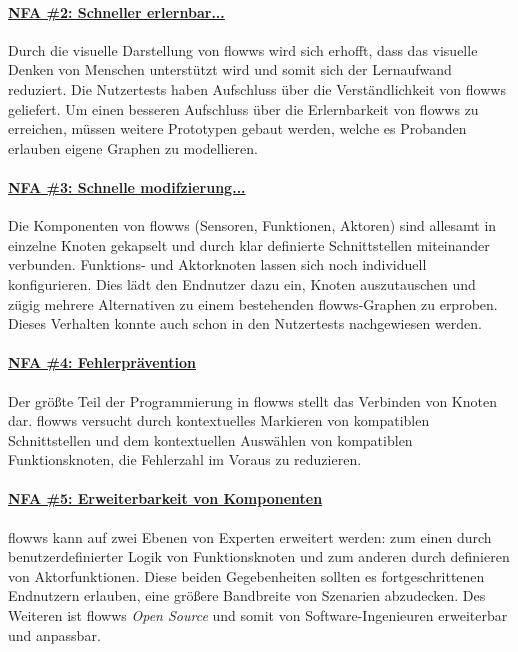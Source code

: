 \paragraph{\hyperref[tab:NFA2]{NFA \#2: Schneller erlernbar...}} Durch die visuelle Darstellung von flowws wird sich erhofft, dass das visuelle Denken von Menschen unterstützt wird und somit sich der Lernaufwand reduziert. Die Nutzertests haben Aufschluss über die Verständlichkeit von flowws geliefert. Um einen besseren Aufschluss über die Erlernbarkeit von flowws zu erreichen, müssen weitere Prototypen gebaut werden, welche es Probanden erlauben eigene Graphen zu modellieren.

\paragraph{\hyperref[tab:NFA3]{NFA \#3: Schnelle modifzierung...}} Die Komponenten von flowws (Sensoren, Funktionen, Aktoren) sind allesamt in einzelne Knoten gekapselt und durch klar definierte Schnittstellen miteinander verbunden. Funktions- und Aktorknoten lassen sich noch individuell konfigurieren. Dies lädt den Endnutzer dazu ein, Knoten auszutauschen und zügig mehrere Alternativen zu einem bestehenden flowws-Graphen zu erproben. Dieses Verhalten konnte auch schon in den Nutzertests nachgewiesen werden.

\paragraph{\hyperref[tab:NFA4]{NFA \#4: Fehlerprävention}} Der größte Teil der Programmierung in flowws stellt das Verbinden von Knoten dar. flowws versucht durch kontextuelles Markieren von kompatiblen Schnittstellen und dem kontextuellen Auswählen von kompatiblen Funktionsknoten, die Fehlerzahl im Voraus zu reduzieren. 

\paragraph{\hyperref[tab:NFA5]{NFA \#5: Erweiterbarkeit von Komponenten}} flowws kann auf zwei Ebenen von Experten erweitert werden: zum einen durch benutzerdefinierter Logik von Funktionsknoten und zum anderen durch definieren von Aktorfunktionen. Diese beiden Gegebenheiten sollten es fortgeschrittenen Endnutzern erlauben, eine größere Bandbreite von Szenarien abzudecken. Des Weiteren ist flowws \textit{Open Source} und somit von Software-Ingenieuren erweiterbar und anpassbar.

